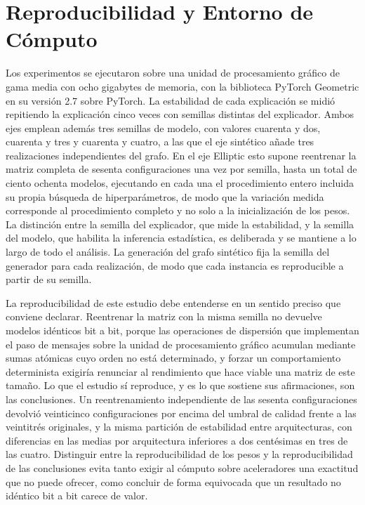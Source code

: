 

\section{Reproducibilidad y Entorno de Cómputo}

Los experimentos se ejecutaron sobre una unidad de procesamiento gráfico de gama media con ocho gigabytes de memoria, con la biblioteca PyTorch Geometric en su versión 2.7 sobre PyTorch. La estabilidad de cada explicación se midió repitiendo la explicación cinco veces con semillas distintas del explicador. Ambos ejes emplean además tres semillas de modelo, con valores cuarenta y dos, cuarenta y tres y cuarenta y cuatro, a las que el eje sintético añade tres realizaciones independientes del grafo. En el eje Elliptic esto supone reentrenar la matriz completa de sesenta configuraciones una vez por semilla, hasta un total de ciento ochenta modelos, ejecutando en cada una el procedimiento entero incluida su propia búsqueda de hiperparámetros, de modo que la variación medida corresponde al procedimiento completo y no solo a la inicialización de los pesos. La distinción entre la semilla del explicador, que mide la estabilidad, y la semilla del modelo, que habilita la inferencia estadística, es deliberada y se mantiene a lo largo de todo el análisis. La generación del grafo sintético fija la semilla del generador para cada realización, de modo que cada instancia es reproducible a partir de su semilla.

La reproducibilidad de este estudio debe entenderse en un sentido preciso que conviene declarar. Reentrenar la matriz con la misma semilla no devuelve modelos idénticos bit a bit, porque las operaciones de dispersión que implementan el paso de mensajes sobre la unidad de procesamiento gráfico acumulan mediante sumas atómicas cuyo orden no está determinado, y forzar un comportamiento determinista exigiría renunciar al rendimiento que hace viable una matriz de este tamaño. Lo que el estudio sí reproduce, y es lo que sostiene sus afirmaciones, son las conclusiones. Un reentrenamiento independiente de las sesenta configuraciones devolvió veinticinco configuraciones por encima del umbral de calidad frente a las veintitrés originales, y la misma partición de estabilidad entre arquitecturas, con diferencias en las medias por arquitectura inferiores a dos centésimas en tres de las cuatro. Distinguir entre la reproducibilidad de los pesos y la reproducibilidad de las conclusiones evita tanto exigir al cómputo sobre aceleradores una exactitud que no puede ofrecer, como concluir de forma equivocada que un resultado no idéntico bit a bit carece de valor.

